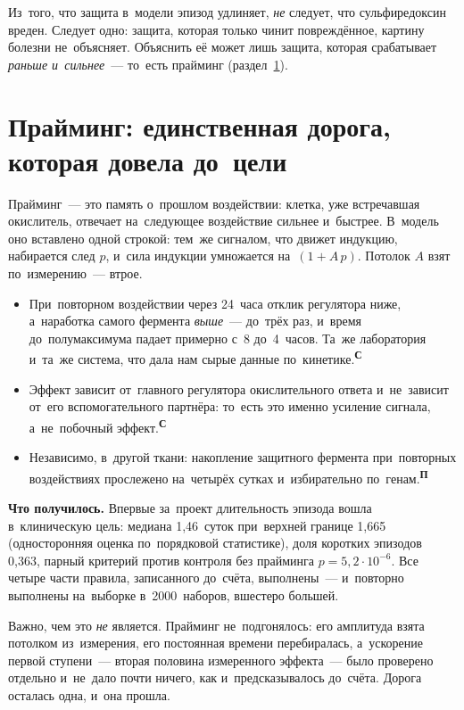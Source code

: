 \documentclass[11pt,a4paper,landscape,twocolumn]{article}
\newcommand{\tS}{\textsuperscript{\sffamily\bfseries\color{cB}С}}
\newcommand{\tP}{\textsuperscript{\sffamily\bfseries\color{cA}П}}
\newcommand{\facts}{\par\vspace{3pt}{\sffamily\bfseries\small\color{cM}Опорные факты}\par\vspace{-2pt}}
\begin{document}
\begin{note}
Из~того, что защита в~модели эпизод удлиняет, \emph{не} следует, что сульфиредоксин вреден. Следует одно: защита, которая только чинит повреждённое, картину болезни не~объясняет. Объяснить её может лишь защита, которая срабатывает \emph{раньше и~сильнее}~— то~есть прайминг (раздел~\ref{sec:prime}).
\end{note}

\section{Прайминг: единственная дорога, которая довела до~цели}\label{sec:prime}
Прайминг~— это память о~прошлом воздействии: клетка, уже встречавшая окислитель, отвечает на~следующее воздействие сильнее и~быстрее. В~модель оно вставлено одной строкой: тем~же сигналом, что движет индукцию, набирается след $p$, и~сила индукции умножается на~$(1+A\,p)$. Потолок $A$ взят по~измерению~— втрое.

\facts
\begin{itemize}
\item При~повторном воздействии через 24~часа отклик регулятора ниже, а~наработка самого фермента \emph{выше}~— до~трёх раз, и~время до~полумаксимума падает примерно с~8 до~4~часов. Та~же лаборатория и~та~же система, что дала нам сырые данные по~кинетике.\tS
\item Эффект зависит от~главного регулятора окислительного ответа и~не~зависит от~его вспомогательного партнёра: то~есть это именно усиление сигнала, а~не~побочный эффект.\tS
\item Независимо, в~другой ткани: накопление защитного фермента при~повторных воздействиях прослежено на~четырёх сутках и~избирательно по~генам.\tP
\end{itemize}

\textbf{Что получилось.} Впервые за~проект длительность эпизода вошла в~клиническую цель: медиана 1,46~суток при~верхней границе 1,665 (односторонняя оценка по~порядковой статистике), доля коротких эпизодов 0,363, парный критерий против контроля без прайминга $p=5{,}2\cdot10^{-6}$. Все четыре части правила, записанного до~счёта, выполнены~— и~повторно выполнены на~выборке в~2000~наборов, вшестеро большей.

Важно, чем это \emph{не} является. Прайминг не~подгонялось: его амплитуда взята потолком из~измерения, его постоянная времени перебиралась, а~ускорение первой ступени~— вторая половина измеренного эффекта~— было проверено отдельно и~не~дало почти ничего, как и~предсказывалось до~счёта. Дорога осталась одна, и~она прошла.
\end{document}
